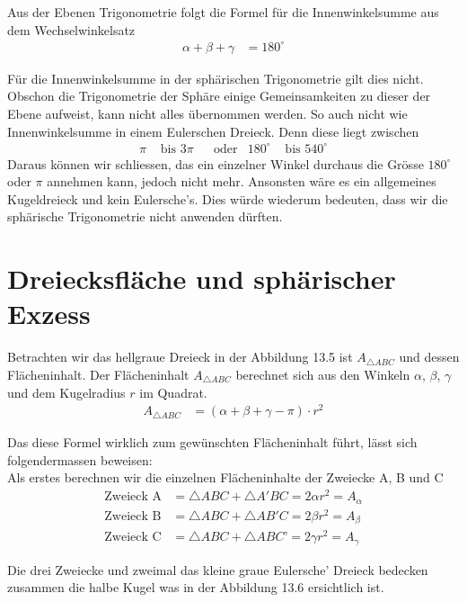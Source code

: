 \begin{refsection}
Aus der Ebenen Trigonometrie folgt die Formel für die Innenwinkelsumme aus dem Wechselwinkelsatz
\begin{align*}
\alpha + \beta + \gamma &= 180^{\circ}
\end{align*}

Für die Innenwinkelsumme in der sphärischen Trigonometrie gilt dies nicht. Obschon die Trigonometrie der Sphäre einige Gemeinsamkeiten zu dieser der Ebene aufweist, kann nicht alles übernommen werden.
So auch nicht wie Innenwinkelsumme in einem Eulerschen Dreieck.
Denn diese liegt zwischen
\[
\begin{aligned}
\pi
&\text{ bis }
3\pi
&
&\text{oder}
&
180^{\circ}
&\text{ bis }
540^{\circ}
\end{aligned}
\]
Daraus können wir schliessen, das ein einzelner Winkel durchaus die Grösse $180^{\circ}$ oder $\pi$ annehmen kann, jedoch nicht mehr. Ansonsten wäre es ein allgemeines Kugeldreieck und kein Eulersche’s. Dies würde wiederum bedeuten, dass wir die sphärische Trigonometrie nicht anwenden dürften.



\section{Dreiecksfläche und sphärischer Exzess} \label{Flaeche} 
Betrachten wir das hellgraue Dreieck in der Abbildung 13.5 ist $A_{ \triangle{ ABC }}$ und dessen Flächeninhalt. Der Flächeninhalt $A_{ \triangle{ ABC }}$ berechnet sich aus den Winkeln $\alpha$, $\beta$, $\gamma$ und dem Kugelradius $r$ im Quadrat.
\begin{align*}
A_{ \triangle{ ABC }} &= (\alpha + \beta + \gamma - \pi) \cdot r^2
\end{align*}

Das diese Formel wirklich zum gewünschten Flächeninhalt führt, lässt sich folgendermassen beweisen:\\
Als erstes berechnen wir die einzelnen Flächeninhalte der Zweiecke A, B und C
\begin{align*}
\text{Zweieck A}
&=
\triangle{ABC} + \triangle{A'BC} = 2 \alpha r^{ 2 } = A_{ \alpha }\\
\text{Zweieck B}
&=
\triangle{ABC} + \triangle{AB'C} = 2 \beta r^{ 2 } = A_{ \beta }\\
\text{Zweieck C}
&=
\triangle{ABC} + \triangle{ABC’} = 2 \gamma r^{ 2 } = A_{ \gamma }
\end{align*}

Die drei Zweiecke und zweimal das kleine graue Eulersche’ Dreieck bedecken zusammen  die halbe Kugel was in der Abbildung 13.6 ersichtlich ist.


\end{refsection}
